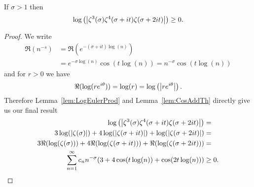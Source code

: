 \begin{corollary}\label{cor:LogZeta}
	If $\sigma > 1$ then
\begin{equation*}
	\log\left(\left|\zeta^3(\sigma) \zeta^4(\sigma + it) \zeta(\sigma + 2it)\right|\right) \geq 0.
\end{equation*}
\end{corollary}
\begin{proof}
	We write
\begin{equation*}
\begin{aligned}	
	\Re(n^{-s}) 
		&= \Re(e^{-(\sigma + it) \log(n)}) \\
		&= e^{-\sigma \log(n)} \cos(t \log(n)) 
		= n^{-\sigma} \cos(t \log(n))
\end{aligned}
\end{equation*}
	and for $r > 0$ we have
\begin{equation*}
	\Re(\log(r e^{i \theta})) = \log(r) = \log\left(\left|r e^{i\theta}\right|\right).
\end{equation*}
	Therefore Lemma~\ref{lem:LogEulerProd} and Lemma~\ref{lem:CosAddTh} directly give us our final result
\begin{equation*}
\begin{aligned}
	\log\left(\left|\zeta^3(\sigma) \zeta^4(\sigma + it) \zeta(\sigma + 2it)\right|\right) &= \\
	3\log(\left|\zeta(\sigma)\right|) + 4\log(\left|\zeta(\sigma + it)\right|) + \log(\left|\zeta(\sigma + 2it)\right|) &= \\
	3\Re(\log(\zeta(\sigma))) + 4\Re(\log(\zeta(\sigma + it))) + \Re(\log(\zeta(\sigma + 2it))) &= \\
	\sum _{n=1} ^{\infty} c_n n^{-\sigma}(3 + 4\cos(t \log(n)) + \cos(2 t \log(n))) &\geq 0.
\end{aligned}
\end{equation*}
\end{proof}


